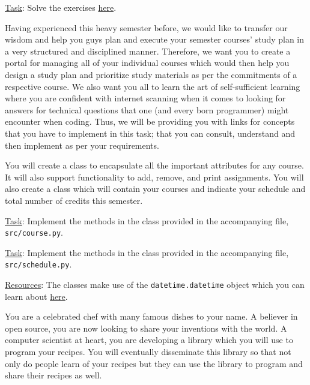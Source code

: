 \documentclass[a4paper]{exam}
\begin{document}
\begin{questions}
\noindent\underline{Task}: Solve the exercises \href{https://pynative.com/python-object-oriented-programming-oop-exercise/}{here}.


Having experienced this heavy semester before, we would like to transfer our wisdom and help you guys plan and execute your semester courses' study plan in a very structured and disciplined manner. Therefore, we want you to create a portal for managing all of your individual courses which would then help you design a study plan and prioritize study materials as per the commitments of a respective course. We also want you all to learn the art of self-sufficient learning where you are confident with internet scanning when it comes to looking for answers for technical questions that one (and every born programmer) might encounter when coding. Thus, we will be providing you with links for concepts that you have to implement in this task; that you can consult, understand and then implement as per your requirements.

You will create a  class to encapsulate all the important attributes for any course. It will also support functionality to add, remove, and print assignments. You will also create a  class which will contain your courses and indicate your schedule and total number of credits this semester.

\noindent\underline{Task}: Implement the methods in the  class provided in the accompanying file, \texttt{src/course.py}.

\noindent\underline{Task}: Implement the methods in the  class provided in the accompanying file, \texttt{src/schedule.py}.

\noindent\underline{Resources}: The classes make use of the \texttt{datetime.datetime} object which you can learn about \href{https://betterprogramming.pub/demystifying-python-datetime-module-with-examples-352e6cc72efc}{here}.


You are a celebrated chef with many famous dishes to your name. A believer in open source, you are now looking to share your inventions with the world. A computer scientist at heart, you are developing a library which you will use to program your recipes. You will eventually disseminate this library so that not only do people learn of your recipes but they can use the library to program and share their recipes as well.


\end{questions}
\end{document}
